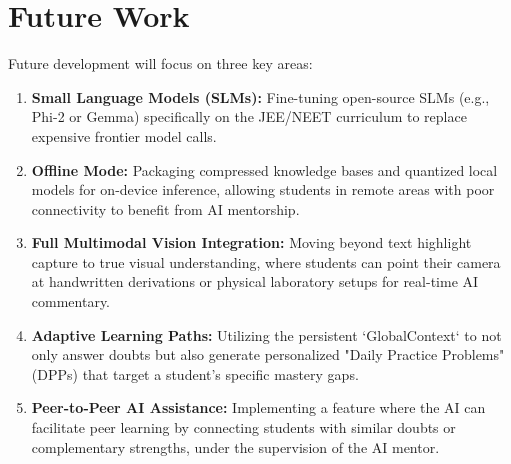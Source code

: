 \section{Future Work}

Future development will focus on three key areas:
\begin{enumerate}
\item \textbf{Small Language Models (SLMs):} Fine-tuning open-source SLMs (e.g., Phi-2 or Gemma) specifically on the JEE/NEET curriculum to replace expensive frontier model calls.
    \item \textbf{Offline Mode:} Packaging compressed knowledge bases and quantized local models for on-device inference, allowing students in remote areas with poor connectivity to benefit from AI mentorship.
    \item \textbf{Full Multimodal Vision Integration:} Moving beyond text highlight capture to true visual understanding, where students can point their camera at handwritten derivations or physical laboratory setups for real-time AI commentary.
    \item \textbf{Adaptive Learning Paths:} Utilizing the persistent `GlobalContext` to not only answer doubts but also generate personalized "Daily Practice Problems" (DPPs) that target a student's specific mastery gaps.
    \item \textbf{Peer-to-Peer AI Assistance:} Implementing a feature where the AI can facilitate peer learning by connecting students with similar doubts or complementary strengths, under the supervision of the AI mentor.
\end{enumerate}



